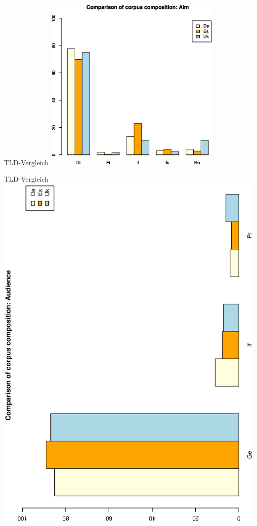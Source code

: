 \begin{frame}
  {TLD-Vergleich}
  \centering
  \includegraphics[width=0.65\textwidth]{graphics/aim}
\end{frame}

\begin{frame}
  {TLD-Vergleich}
  \centering
  \includegraphics[height=0.95\textheight,angle=270]{graphics/aud}
\end{frame}

